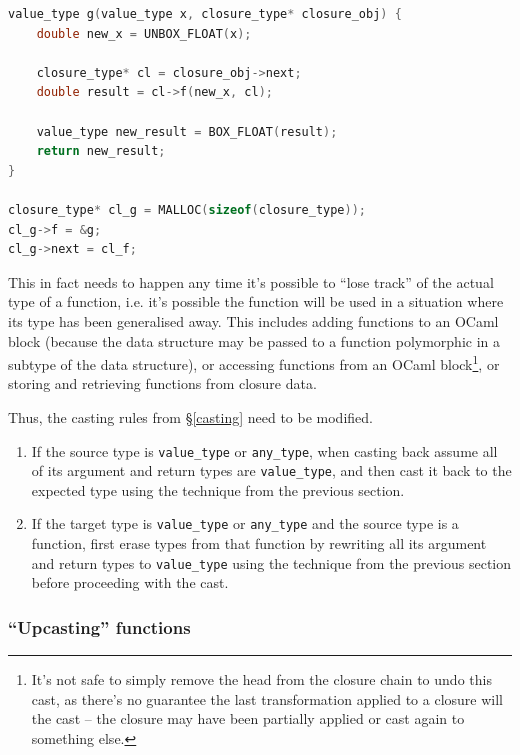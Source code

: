 \begin{lstlisting}[language=C]
value_type g(value_type x, closure_type* closure_obj) {
    double new_x = UNBOX_FLOAT(x);

    closure_type* cl = closure_obj->next;
    double result = cl->f(new_x, cl);
    
    value_type new_result = BOX_FLOAT(result);
    return new_result;
}

closure_type* cl_g = MALLOC(sizeof(closure_type));
cl_g->f = &g;
cl_g->next = cl_f;
\end{lstlisting}

This in fact needs to happen any time it's possible to ``lose track'' of the
actual type of a function, i.e. it's possible the function will be used in a
situation where its type has been generalised away. This includes adding
functions to an OCaml block (because the data structure may be passed to a
function polymorphic in a subtype of the data structure), or accessing functions
from an OCaml block\footnote{It's not safe to simply remove the head from the
    closure chain to undo this cast, as there's no guarantee the last
    transformation applied to a closure will the cast -- the closure may have
been partially applied or cast again to something else.}, or storing and
retrieving functions from closure data.

Thus, the casting rules from \S\ref{casting} need to be modified.

\begin{enumerate}

\item If the source type is \verb|value_type| or \verb|any_type|, when casting
    back assume all of its argument and return types are \verb|value_type|, and
    then cast it back to the expected type using the technique from the previous
    section.

\item If the target type is \verb|value_type| or \verb|any_type| and the source
    type is a function, first erase types from that function by rewriting all
    its argument and return types to \verb|value_type| using the technique from
    the previous section before proceeding with the cast.

\end{enumerate}

\subsubsection{``Upcasting'' functions}

